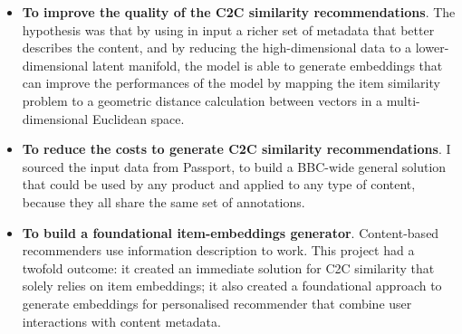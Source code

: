 \begin{itemize}
  \item \textbf{To improve the quality of the C2C similarity recommendations}. The hypothesis was that by using in input a richer set of metadata that
  better describes the content, and by reducing the high-dimensional data to a lower-dimensional latent manifold,
  the model is able to generate embeddings that can improve the performances of the model by mapping the
  item similarity problem to a geometric distance calculation between vectors in a multi-dimensional Euclidean space.
  \item \textbf{To reduce the costs to generate C2C similarity recommendations}. I sourced the input
  data from Passport, to build a BBC-wide general solution that could be used by any product and applied to any type of content,
  because they all share the same set of annotations.
  \item \textbf{To build a foundational item-embeddings generator}. Content-based recommenders
  use information description to work. This project had a twofold outcome: it created an immediate solution for C2C similarity
  that solely relies on item embeddings; it also created a foundational approach to generate embeddings for personalised recommender
  that combine user interactions with content metadata.
\end{itemize}
